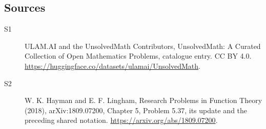 \documentclass[11pt]{article}
\begin{document}
\subsection{Sources}
\begin{description}
\item[\hypertarget{source:statement:1}{S1}] ULAM.AI and the UnsolvedMath Contributors, UnsolvedMath: A Curated Collection of Open Mathematics Problems, catalogue entry. CC BY 4.0. \url{https://huggingface.co/datasets/ulamai/UnsolvedMath}.
\item[\hypertarget{source:statement:2}{S2}] W. K. Hayman and E. F. Lingham, Research Problems in Function Theory (2018), arXiv:1809.07200, Chapter 5, Problem 5.37, its update and the preceding shared notation. \url{https://arxiv.org/abs/1809.07200}.
\end{description}
\label{end:statement}
\end{document}
